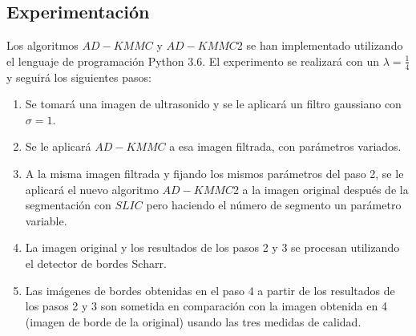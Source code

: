 \documentclass[a4paper,10pt,twocolumn]{article}
\begin{document}
\subsection{Experimentaci\'on}\label{sec:experimentacion}

Los algoritmos $AD-KMMC$ y $AD-KMMC2$ se han implementado utilizando el lenguaje de programaci\'on Python 3.6. El experimento se realizar\'a con un $\lambda = \frac{1}{4}$ y seguir\'a los siguientes pasos:

\begin{enumerate}
\item Se tomar\'a una imagen de ultrasonido y se le aplicar\'a un filtro gaussiano con $\sigma=1$.
\item Se le aplicar\'a $AD-KMMC$ a esa imagen filtrada, con par\'ametros variados.
\item A la misma imagen filtrada y fijando los mismos par\'ametros del paso 2, se le aplicar\'a el nuevo algoritmo $AD-KMMC2$ a la imagen original despu\'es de la segmentaci\'on con $SLIC$ pero haciendo el n\'umero de segmento un par\'ametro variable.
\item La imagen original y los resultados de los pasos 2 y 3 se procesan utilizando el detector de bordes Scharr.
\item Las im\'agenes de bordes obtenidas en el paso 4 a partir de los resultados de los pasos 2 y 3 son sometida en comparaci\'on con la imagen obtenida en 4 (imagen de borde de la original) usando las tres medidas de calidad.
\end{enumerate}
\end{document}
